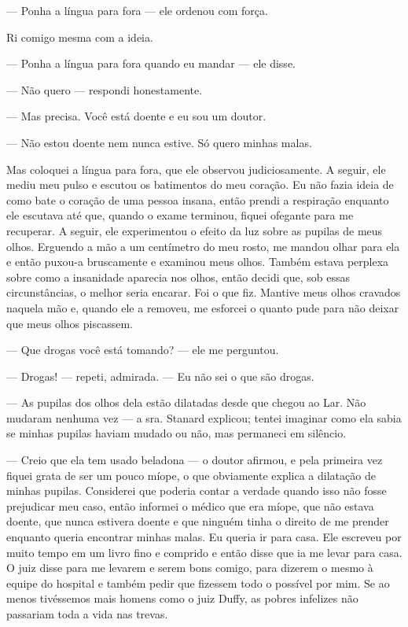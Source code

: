 --- Ponha a língua para fora --- ele ordenou com força.

Ri comigo mesma com a ideia.

--- Ponha a língua para fora quando eu mandar --- ele disse.

--- Não quero --- respondi honestamente.

--- Mas precisa. Você está doente e eu sou um doutor.

--- Não estou doente nem nunca estive. Só quero minhas malas.

Mas
coloquei a língua para fora, que ele observou judiciosamente. A seguir,
ele mediu meu pulso e escutou os batimentos do meu coração. Eu não fazia
ideia de como bate o coração de uma pessoa insana, então prendi a
respiração enquanto ele escutava até que, quando o exame terminou,
fiquei ofegante para me recuperar. A seguir, ele experimentou o efeito
da luz sobre as pupilas de meus olhos. Erguendo a mão a um centímetro do
meu rosto, me mandou olhar para ela e então puxou-a bruscamente e
examinou meus olhos. Também estava perplexa sobre como a insanidade
aparecia nos olhos, então decidi que, sob essas circunstâncias, o melhor
seria encarar. Foi o que fiz. Mantive meus olhos cravados naquela mão e,
quando ele a removeu, me esforcei o quanto pude para não deixar que meus
olhos piscassem.

--- Que drogas você está tomando? --- ele me perguntou.

--- Drogas! --- repeti, admirada. --- Eu não sei o que são drogas.

--- As pupilas dos olhos dela estão dilatadas desde que chegou ao Lar.
Não mudaram nenhuma vez --- a sra. Stanard explicou; tentei imaginar
como ela sabia se minhas pupilas haviam mudado ou não, mas permaneci em
silêncio.

--- Creio que ela tem usado beladona --- o doutor afirmou, e pela
primeira vez fiquei grata de ser um pouco míope, o que obviamente
explica a dilatação de minhas pupilas. Considerei que poderia contar a
verdade quando isso não fosse prejudicar meu caso, então informei o
médico que era míope, que não estava doente, que nunca estivera doente e
que ninguém tinha o direito de me prender enquanto queria encontrar
minhas malas. Eu queria ir para casa. Ele escreveu por muito tempo em um
livro fino e comprido e então disse que ia me levar para casa. O juiz
disse para me levarem e serem bons comigo, para dizerem o mesmo à equipe
do hospital e também pedir que fizessem todo o possível por mim. Se ao
menos tivéssemos mais homens como o juiz Duffy, as pobres infelizes não
passariam toda a vida nas trevas.

